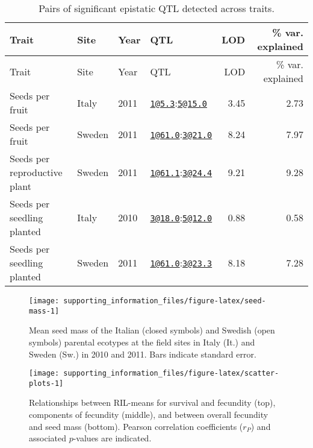 \documentclass[]{article}
\begin{document}
\begin{longtable}[]{@{}llllrr@{}}
\caption{Pairs of significant epistatic QTL detected across
traits.}\tabularnewline
\toprule
Trait & Site & Year & QTL & LOD & \% var. explained\tabularnewline
\midrule
\endfirsthead
\toprule
Trait & Site & Year & QTL & LOD & \% var. explained\tabularnewline
\midrule
\endhead
Seeds per fruit & Italy & 2011 &
\href{mailto:1@5.3}{\nolinkurl{1@5.3}}:\href{mailto:5@15.0}{\nolinkurl{5@15.0}}
& 3.45 & 2.73\tabularnewline
Seeds per fruit & Sweden & 2011 &
\href{mailto:1@61.0}{\nolinkurl{1@61.0}}:\href{mailto:3@21.0}{\nolinkurl{3@21.0}}
& 8.24 & 7.97\tabularnewline
Seeds per reproductive plant & Sweden & 2011 &
\href{mailto:1@61.1}{\nolinkurl{1@61.1}}:\href{mailto:3@24.4}{\nolinkurl{3@24.4}}
& 9.21 & 9.28\tabularnewline
Seeds per seedling planted & Italy & 2010 &
\href{mailto:3@18.0}{\nolinkurl{3@18.0}}:\href{mailto:5@12.0}{\nolinkurl{5@12.0}}
& 0.88 & 0.58\tabularnewline
Seeds per seedling planted & Sweden & 2011 &
\href{mailto:1@61.0}{\nolinkurl{1@61.0}}:\href{mailto:3@23.3}{\nolinkurl{3@23.3}}
& 8.18 & 7.28\tabularnewline
\bottomrule
\end{longtable}

\newpage

\begin{figure}

{\centering \texttt{[image: supporting\_information\_files/figure-latex/seed-mass-1]} 

}

\caption[Seed mass among parental lines]{Mean seed mass of the Italian (closed symbols) and Swedish (open symbols) parental ecotypes at the field sites in Italy (It.) and Sweden (Sw.) in 2010 and 2011. Bars indicate standard error.}\label{fig:seed-mass}
\end{figure}

\newpage

\begin{figure}

{\centering \texttt{[image: supporting\_information\_files/figure-latex/scatter-plots-1]} 

}

\caption[Scatter plots between RIL-means for survival and fecundity, components of fecundity, and between overall fecundity and seed mass]{Relationships between RIL-means for survival and fecundity (top), components of fecundity (middle), and between overall fecundity and seed mass (bottom). Pearson correlation coefficients ($r_P$) and associated $p$-values are indicated.}\label{fig:scatter-plots}
\end{figure}
\end{document}
